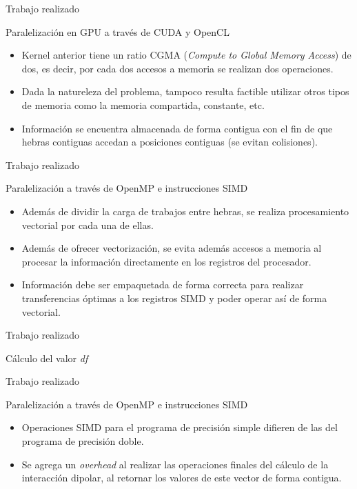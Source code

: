 \begin{frame}{Trabajo realizado}
\begin{block}{Paralelización en GPU a través de CUDA y OpenCL}
\begin{itemize}
  \item Kernel anterior tiene un ratio CGMA (\textit{Compute to Global Memory Access}) de dos, es decir, por cada dos accesos a memoria se realizan dos operaciones.
  \item Dada la natureleza del problema, tampoco resulta factible utilizar otros tipos de memoria como la memoria compartida, constante, etc.
  \item Información se encuentra almacenada de forma contigua con el fin de que hebras contiguas accedan a posiciones contiguas (se evitan colisiones).
\end{itemize}
\end{block}
\end{frame}

\begin{frame}{Trabajo realizado}
\begin{block}{Paralelización a través de OpenMP e instrucciones SIMD}
\begin{itemize}
  \item Además de dividir la carga de trabajos entre hebras, se realiza procesamiento vectorial por cada una de ellas.
  \item Además de ofrecer vectorización, se evita además accesos a memoria al procesar la información directamente en los registros del procesador.
  \item Información debe ser empaquetada de forma correcta para realizar transferencias óptimas a los registros SIMD y poder operar así de forma vectorial.
\end{itemize}
\end{block}
\end{frame}

\begin{frame}{Trabajo realizado}
\begin{block}{Cálculo del valor \textit{df}}
\centerline{
      }
\end{block}
\end{frame}

\begin{frame}{Trabajo realizado}
\begin{block}{Paralelización a través de OpenMP e instrucciones SIMD}
\begin{itemize}
  \item Operaciones SIMD para el programa de precisión simple difieren de las del programa de precisión doble.
  \item Se agrega un \textit{overhead} al realizar las operaciones finales del cálculo de la interacción dipolar, al retornar los valores de este vector de forma contigua.
\end{itemize}
\end{block}
\end{frame}